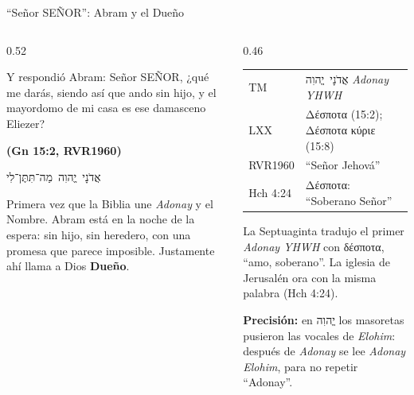 \documentclass[hyperref={bookmarks=false},aspectratio=169]{beamer}
\newcommand{\heb}[1]{\mbox{\foreignlanguage{hebrew}{#1}}}
\newcommand{\grc}[1]{\foreignlanguage{ancientgreek}{#1}}
\newcommand{\SENOR}{S{\fontsize{0.78em}{1em}\selectfont EÑOR}}
\newcommand{\fuente}[1]{\par\hfill{\upshape\bfseries\footnotesize\textcolor{azul}{#1}}}
\newcommand{\destacar}[1]{\textbf{\textcolor{azul}{#1}}}
\newcommand{\precision}[1]{{\footnotesize\color{gris}\textbf{Precisión:} #1}}
\begin{document}
\begin{frame}{``Señor \SENOR'': Abram y el Dueño}
\begin{columns}[t,onlytextwidth]
\begin{column}{0.52\textwidth}
\begin{cita}Y respondió Abram: Señor \SENOR, ¿qué me darás, siendo así que ando sin hijo, y el mayordomo de mi casa es ese damasceno Eliezer?\fuente{(Gn 15:2, RVR1960)}\end{cita}
\begin{center}\heb{אֲדֹנָי יֱהוִה מַה־תִּתֶּן־לִי}\end{center}
\scriptsize Primera vez que la Biblia une \emph{Adonay} y el Nombre. Abram está en la noche de la espera: sin hijo, sin heredero, con una promesa que parece imposible. Justamente ahí llama a Dios \destacar{Dueño}.
\end{column}
\begin{column}{0.46\textwidth}
\scriptsize\renewcommand{\arraystretch}{1.15}
\begin{tabular}{@{}>{\RaggedRight\arraybackslash}p{1.6cm}>{\RaggedRight\arraybackslash}p{4.0cm}@{}}
\toprule
TM & \heb{אֲדֹנָי יֱהוִה} \emph{Adonay YHWH} \\
LXX & \grc{Δέσποτα} (15:2); \grc{Δέσποτα κύριε} (15:8) \\
RVR1960 & ``Señor Jehová'' \\
Hch 4:24 & \grc{Δέσποτα}: ``Soberano Señor'' \\
\bottomrule
\end{tabular}\par\medskip
\small La Septuaginta tradujo el primer \emph{Adonay YHWH} con \grc{δέσποτα}, ``amo, soberano''. La iglesia de Jerusalén ora con la misma palabra (Hch 4:24).\par\smallskip
\precision{en \heb{יֱהוִה} los masoretas pusieron las vocales de \emph{Elohim}: después de \emph{Adonay} se lee \emph{Adonay Elohim}, para no repetir ``Adonay''.}
\end{column}
\end{columns}
\end{frame}
\end{document}
